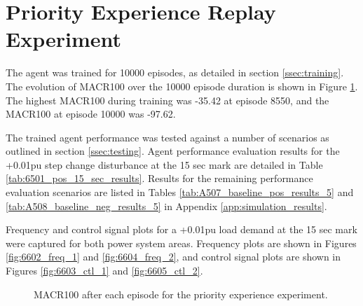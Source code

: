 \section{Priority Experience Replay Experiment}
The agent was trained for 10000 episodes, as detailed in section \ref{ssec:training}. The evolution of MACR100 over the 10000 episode duration is shown in Figure \ref{fig:6601_average_reward}. The highest MACR100 during training was -35.42 at episode 8550, and the MACR100 at episode 10000 was -97.62.

The trained agent performance was tested against a number of scenarios as outlined in section \ref{ssec:testing}. Agent performance evaluation results for the +0.01pu step change disturbance at the 15 sec mark are detailed in Table \ref{tab:6501_pos_15_sec_results}. Results for the remaining performance evaluation scenarios are listed in Tables \ref{tab:A507_baseline_pos_results_5} and \ref{tab:A508_baseline_neg_results_5} in Appendix \ref{app:simulation_results}.

Frequency and control signal plots for a +0.01pu load demand at the 15 sec mark were captured for both power system areas. Frequency plots are shown in Figures \ref{fig:6602_freq_1} and \ref{fig:6604_freq_2}, and control signal plots are shown in Figures \ref{fig:6603_ctl_1} and \ref{fig:6605_ctl_2}.

\begin{figure}[h]
	\centering
	
	\caption{MACR100 after each episode for the priority experience experiment.}\label{fig:6601_average_reward}
\end{figure}



